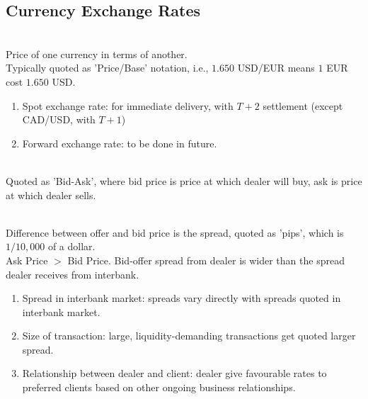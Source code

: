 \subsection{Currency Exchange Rates}

\begin{definition} \\
Price of one currency in terms of another.\\
Typically quoted as 'Price/Base' notation, i.e., $1.650$ USD/EUR means $1$ EUR cost $1.650$ USD.
\begin{enumerate}[label=\roman*.]
\setlength{\itemsep}{0pt}
\item Spot exchange rate: for immediate delivery, with $T+2$ settlement (except CAD/USD, with $T+1$)
\item Forward exchange rate: to be done in future.
\end{enumerate}
\end{definition}

\begin{remark} \\
Quoted as 'Bid-Ask', where bid price is price at which dealer will buy, ask is price at which dealer sells.
\end{remark}

\begin{remark} \\
Difference between offer and bid price is the spread, quoted as 'pips', which is $1/10,000$ of a dollar.\\
Ask Price $>$ Bid Price. Bid-offer spread from dealer is wider than the spread dealer receives from interbank.
\end{remark}

\begin{remark} 
\begin{enumerate}[label=\roman*.]
\setlength{\itemsep}{0pt}
\item Spread in interbank market: spreads vary directly with spreads quoted in interbank market.
\item Size of transaction: large, liquidity-demanding transactions get quoted larger spread.
\item Relationship between dealer and client: dealer give favourable rates to preferred clients based on other ongoing business relationships.
\end{enumerate}
\end{remark}

